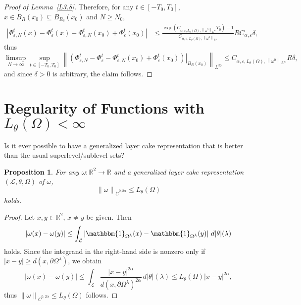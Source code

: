\documentclass[reqno,centertags,12pt]{amsart}
\newtheorem{proposition}[theorem]{Proposition}
\theoremstyle{definition}
\numberwithin{equation}{section}
\newcommand{\abs}[1]{\left\lvert#1\right\rvert}
\newcommand{\norm}[1]{\left\|#1\right\|}
\newcommand{\bbR}{{\mathbb{R}}}
\newcommand{\eps}{\varepsilon}
\newcommand{\tht}{\theta}
\begin{document}
\begin{proof}[Proof of Lemma~\ref{L3.8}]
    Therefore, for any $t\in[-T_{0},T_{0}]$, 
    $x\in B_{R}(x_{0}) \subseteq B_{R_{\delta}}(x_{0})$ and $N\geq N_{0}$,
    \begin{align*}
        \abs{\Phi_{\eps,N}^{t}(x) - \Phi_{\eps}^{t}(x)
        - \Phi_{\eps,N}^{t}(x_{0}) + \Phi_{\eps}^{t}(x_{0})}
        &\leq \frac{\exp(C_{\alpha,\eps,L_{\tht}(\Omega),\norm{\omega^{0}}_{L^{\infty}}}T_{0}) - 1}
        {C_{\alpha,\eps,L_{\tht}(\Omega),\norm{\omega^{0}}_{L^{\infty}}}}
        RC_{\alpha,\eps}\delta,
    \end{align*}
    thus
    \[
        \limsup_{N\to\infty}\sup_{t\in[-T_{0},T_{0}]}\norm{\left.\left(
            \Phi_{\eps,N}^{t} - \Phi_{\eps}^{t}
            - \Phi_{\eps,N}^{t}(x_{0}) + \Phi_{\eps}^{t}(x_{0})
        \right)\right|_{B_{R}(x_{0})}}_{L^{\infty}}
        \leq C_{\alpha,\eps,L_{\tht}(\Omega),\norm{\omega^{0}}_{L^{\infty}}}R\delta,
    \]
    and since $\delta>0$ is arbitrary, the claim follows.
\end{proof}


\appendix

\section{Regularity of Functions with $L_{\tht}(\Omega)<\infty$}

{\color{red}Is it ever possible to have a generalized layer cake representation
that is better than the usual superlevel/sublevel sets?}

\begin{proposition}
    For any $\omega\colon\bbR^{2}\to\bbR$ and a generalized layer cake representation
    $(\mathcal{L},\theta,\Omega)$ of $\omega$,
    \[
        \norm{\omega}_{\dot{C}^{0,2\alpha}} \leq L_{\tht}(\Omega)
    \]
    holds.
\end{proposition}

\begin{proof}
    Let $x,y\in\bbR^{2}$, $x\neq y$ be given. Then
    \begin{align*}
        \abs{\omega(x) - \omega(y)}
        \leq \int_{\mathcal{L}}
        \abs{\mathbbm{1}_{\Omega^{\lambda}}(x) - \mathbbm{1}_{\Omega^{\lambda}}(y)}
        \,d|\theta|(\lambda)
    \end{align*}
    holds. Since the integrand in the right-hand side is nonzero
    only if $\abs{x - y} \geq d(x,\partial\Omega^{\lambda})$, we obtain
    \[
        \abs{\omega(x) - \omega(y)}
        \leq \int_{\mathcal{L}}\frac{\abs{x - y}^{2\alpha}}
        {d(x,\partial\Omega^{\lambda})^{2\alpha}}\,d|\theta|(\lambda)
        \leq L_{\tht}(\Omega)\abs{x - y}^{2\alpha},
    \]
    thus $\norm{\omega}_{\dot{C}^{0,2\alpha}} \leq L_{\tht}(\Omega)$ follows.
\end{proof}
\end{document}

